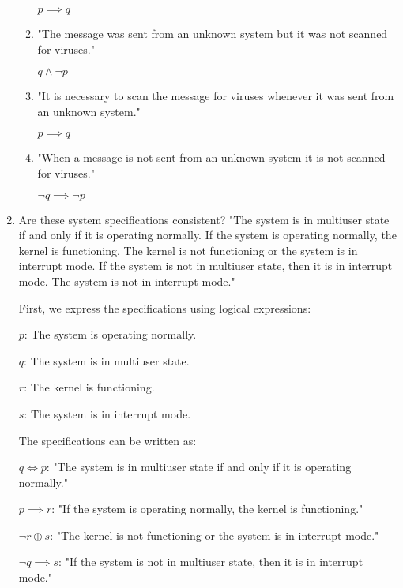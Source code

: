 \documentclass[11pt]{article}
\begin{document}
\begin{enumerate}[label=\textbf{\arabic*.}]
\begin{enumerate}[label=\textbf{\alph*)}]
		$p \implies q$
		
		\item "The message was sent from an unknown system but it was not scanned for viruses."
		
		$q \land \neg p$
		
		\item "It is necessary to scan the message for viruses whenever it was sent from an unknown system."
		
		$p \implies q$
		
		\item "When a message is not sent from an unknown system it is not scanned for viruses."
		
		$\neg q \implies \neg p$
	\end{enumerate}

	\item Are these system specifications consistent? "The system is in multiuser state if and only if it is operating normally. If the system is operating normally, the kernel is functioning. The kernel is not functioning or the system is in interrupt mode. If the system is not in multiuser state, then it is in interrupt mode. The system is not in interrupt mode."
	
	First, we express the specifications using logical expressions:
	
	\hspace{1em}$p$: The system is operating normally.
	
	\hspace{1em}$q$: The system is in multiuser state.
	
	\hspace{1em}$r$: The kernel is functioning.
	
	\hspace{1em}$s$: The system is in interrupt mode.
	
	The specifications can be written as:
	
	\hspace{1em}$q \iff p$: "The system is in multiuser state if and only if it is operating normally."
	
	\hspace{1em}$p \implies r$: "If the system is operating normally, the kernel is functioning."
	
	\hspace{1em}$\neg r \oplus s$: "The kernel is not functioning or the system is in interrupt mode."
	
	\hspace{1em}$\neg q \implies s$: "If the system is not in multiuser state, then it is in interrupt mode."
	

\end{enumerate}
\end{document}
